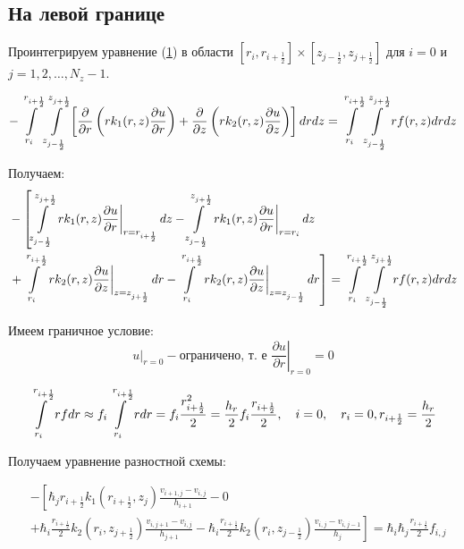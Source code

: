 \subsection{На левой границе}

Проинтегрируем уравнение (\hyperref[eq1]{1}) в области
$ [r_{i}, r_{i +\frac{1}{2}}] \times  [z_{j -\frac{1}{2}}, z_{j +\frac{1}{2}}] $
для $ i = 0 $ и $ j = 1, 2, \dots, N_z - 1$.

\[
  - \mLim{+\frac{1}{2}}{}{+\frac{1}{2}}{-\frac{1}{2}} \left [ \pdv{}{r} \left ( r k_1(r, z) \pdv{u}{r} \right ) 
  + \pdv{}{z} \left ( rk_2(r, z)\pdv{u}{z} \right ) \right ] dr dz = \mLim{+\frac{1}{2}}{}{+\frac{1}{2}}{-\frac{1}{2}} rf(r, z) dr dz
\]

Получаем:
\begin{align*}
  &- \left [
   \mLimZ{z}{+\frac{1}{2}}{-\frac{1}{2}}{j}  \left . r k_1(r, z) \pdv{u}{r} \right \vert_{r = r_{i + \frac{1}{2}}} dz
  - \mLimZ{z}{+\frac{1}{2}}{-\frac{1}{2}}{j} \left . r k_1(r, z) \pdv{u}{r} \right \vert_{r = r_{i}} dz
  \right . \\
  &\left . + \mLimS{r}{+\frac{1}{2}}{} \left . rk_2(r, z)\pdv{u}{z} \right \vert_{z = z_{j + \frac{1}{2}}} dr
  - \mLimS{r}{+\frac{1}{2}}{} \left . rk_2(r, z)\pdv{u}{z} \right \vert_{z = z_{j - \frac{1}{2}}} dr
  \right ] = \mLim{+\frac{1}{2}}{}{+\frac{1}{2}}{-\frac{1}{2}} rf(r, z) dr dz
\end{align*}

Имеем граничное условие:
\[
  \left . u \right \vert_{r=0} - \text{ограничено, т. е } \left . \frac{\partial u}{ \partial r} \right |_{r = 0} = 0
\]

\[
  \mLimS{r}{+ \frac{1}{2}}{} rf dr \approx f_i \mLimS{r}{ + \frac{1}{2}}{} r dr = 
  f_i \frac{r^2_{i + \frac{1}{2}}}{2} = \frac{h_r}{2} f_i \frac{r_{i + \frac{1}{2}}}{2},
  \quad i = 0, \quad r_i = 0, r_{i + \frac{1}{2}} = \frac{h_r}{2}
\]

Получаем уравнение разностной схемы:

\begin{align*}
  &- \left [ 
  \hbar_j r_{i+\frac{1}{2}} k_1(r_{i+\frac{1}{2}}, z_j) \frac{v_{i+1, j} - v_{i, j}}{h_{i + 1}}
  - 0
  \right . \\
  &\left .
  + \hbar_i \frac{r_{i + \frac{1}{2}}}{2} k_2(r_i, z_{j+\frac{1}{2}}) \frac{v_{i, j + 1} - v_{i, j}}{h_{j + 1}}
  - \hbar_i \frac{r_{i + \frac{1}{2}}}{2} k_2(r_i, z_{j-\frac{1}{2}}) \frac{v_{i, j} - v_{i, j - 1}}{h_j}
  \right ]  = \hbar_i \hbar_j \frac{r_{i + \frac{1}{2}}}{2} f_{i, j}
\end{align*}

